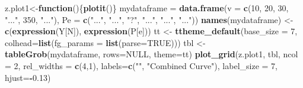 \documentclass[12pt,oneside]{reedthesis}
\newenvironment{Shaded}{\begin{snugshade}}{\end{snugshade}}
\newcommand{\ControlFlowTok}[1]{\textcolor[rgb]{0.13,0.29,0.53}{\textbf{#1}}}
\newcommand{\DataTypeTok}[1]{\textcolor[rgb]{0.13,0.29,0.53}{#1}}
\newcommand{\DecValTok}[1]{\textcolor[rgb]{0.00,0.00,0.81}{#1}}
\newcommand{\FloatTok}[1]{\textcolor[rgb]{0.00,0.00,0.81}{#1}}
\newcommand{\KeywordTok}[1]{\textcolor[rgb]{0.13,0.29,0.53}{\textbf{#1}}}
\newcommand{\NormalTok}[1]{#1}
\newcommand{\OperatorTok}[1]{\textcolor[rgb]{0.81,0.36,0.00}{\textbf{#1}}}
\newcommand{\OtherTok}[1]{\textcolor[rgb]{0.56,0.35,0.01}{#1}}
\newcommand{\StringTok}[1]{\textcolor[rgb]{0.31,0.60,0.02}{#1}}
\begin{document}
\begin{Shaded}
\begin{Highlighting}[]
\NormalTok{z.plot1<-}\ControlFlowTok{function}\NormalTok{()\{}\KeywordTok{plotit}\NormalTok{()\}}
\NormalTok{mydataframe =}\StringTok{ }\KeywordTok{data.frame}\NormalTok{(}\DataTypeTok{v =} \KeywordTok{c}\NormalTok{(}\DecValTok{10}\NormalTok{, }\DecValTok{20}\NormalTok{, }\DecValTok{30}\NormalTok{, }\StringTok{"..."}\NormalTok{, }\DecValTok{350}\NormalTok{, }\StringTok{"..."}\NormalTok{), }\DataTypeTok{Pe =} \KeywordTok{c}\NormalTok{(}\StringTok{"..."}\NormalTok{, }\StringTok{"..."}\NormalTok{, }\StringTok{"?"}\NormalTok{, }\StringTok{"..."}\NormalTok{, }\StringTok{"..."}\NormalTok{, }\StringTok{"..."}\NormalTok{))}
\KeywordTok{names}\NormalTok{(mydataframe) <-}\StringTok{ }\KeywordTok{c}\NormalTok{(}\KeywordTok{expression}\NormalTok{(Y[N]), }\KeywordTok{expression}\NormalTok{(P[e]))}
\NormalTok{tt <-}\StringTok{ }\KeywordTok{ttheme_default}\NormalTok{(}\DataTypeTok{base_size =} \DecValTok{7}\NormalTok{, }\DataTypeTok{colhead=}\KeywordTok{list}\NormalTok{(}\DataTypeTok{fg_params =} \KeywordTok{list}\NormalTok{(}\DataTypeTok{parse=}\OtherTok{TRUE}\NormalTok{)))}
\NormalTok{tbl <-}\StringTok{ }\KeywordTok{tableGrob}\NormalTok{(mydataframe, }\DataTypeTok{rows=}\OtherTok{NULL}\NormalTok{, }\DataTypeTok{theme=}\NormalTok{tt)}
\KeywordTok{plot_grid}\NormalTok{(z.plot1, tbl, }\DataTypeTok{ncol =} \DecValTok{2}\NormalTok{, }\DataTypeTok{rel_widths =} \KeywordTok{c}\NormalTok{(}\DecValTok{4}\NormalTok{,}\DecValTok{1}\NormalTok{), }\DataTypeTok{labels=}\KeywordTok{c}\NormalTok{(}\StringTok{""}\NormalTok{, }\StringTok{"Combined Curve"}\NormalTok{), }\DataTypeTok{label_size =} \DecValTok{7}\NormalTok{, }\DataTypeTok{hjust=}\OperatorTok{-}\FloatTok{0.13}\NormalTok{)}
\end{Highlighting}
\end{Shaded}
\normalsize
\end{document}

